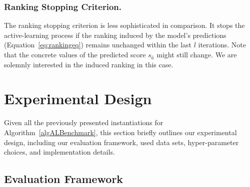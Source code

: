 \documentclass[runningheads]{llncs}
\begin{document}
\subsubsection{Ranking Stopping Criterion.}

The ranking stopping criterion is less sophisticated in comparison.
It stops the active-learning process if the ranking induced by the model's predictions (Equation~\ref{eq:rankingeq}) remains unchanged within the last $l$ iterations.
Note that the concrete values of the predicted score $s_{\hat a}$ might still change.
We are solemnly interested in the induced ranking in this case.


\section{Experimental Design}
\label{sec:exdesign}

Given all the previously presented instantiations for Algorithm~\ref{algALBenchmark}, this section briefly outlines our experimental design, including our evaluation framework, used data sets, hyper-parameter choices, and implementation details.

\subsection{Evaluation Framework}
\label{sec:exdesign:eval}
\end{document}
